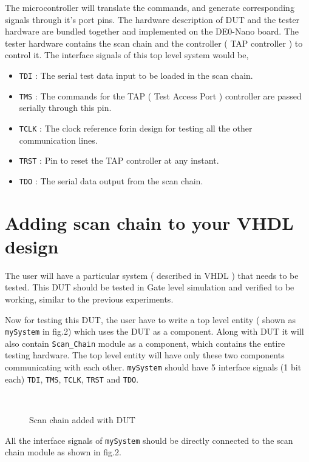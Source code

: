 \documentclass[a4paper,11pt]{article}
\begin{document}
The microcontroller will translate the commands, and generate corresponding signals through it's port pins. The hardware description of DUT and the tester hardware are bundled together and implemented on the DE0-Nano board. The tester hardware contains the scan chain and the controller ( TAP controller ) to control it. The interface signals of this top level system would be,

\begin{itemize}
\item \texttt{TDI} : The serial test data input to be loaded in the scan chain.
\item \texttt{TMS} : The commands for the TAP ( Test Access Port ) controller are passed serially through this pin.
\item \texttt{TCLK} : The clock reference forin design for testing all the other communication lines.
\item \texttt{TRST} : Pin to reset the TAP controller at any instant.
\item \texttt{TDO} : The serial data output from the scan chain.
\end{itemize}


\section{Adding scan chain to your VHDL design}

The user will have a particular system ( described in VHDL ) that needs to be tested. This DUT should be tested in Gate level simulation and verified to be working, similar to the previous experiments.

Now for testing this DUT, the user have to write a top level entity ( shown as \texttt{mySystem} in fig.2) which uses the DUT as a component. Along with DUT it will also contain \texttt{Scan\_Chain} module as a component, which contains the entire testing hardware. The top level entity will have only these two components communicating with each other.
\texttt{mySystem} should have 5 interface signals (1 bit each) \texttt{TDI}, \texttt{TMS}, \texttt{TCLK}, \texttt{TRST} and \texttt{TDO}.
\begin{figure}[h!]
\centering
\\
\caption{Scan chain added with DUT}
\end{figure}

All the interface signals of \texttt{mySystem} should be directly connected to the scan chain module as shown in fig.2. 
\end{document}
